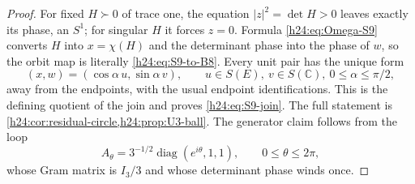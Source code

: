 
\begin{proof}
For fixed $H\succ0$ of trace one, the equation
$|z|^2=\det H>0$ leaves exactly its phase, an $S^1$; for singular $H$ it
forces $z=0$.  Formula \eqref{h24:eq:Omega-S9} converts $H$ into $x=\chi(H)$
and the determinant phase into the phase of $w$, so the orbit map is
literally \eqref{h24:eq:S9-to-B8}.  Every unit pair has the unique form
\[
 (x,w)=(\cos\alpha\,u,\sin\alpha\,v),\qquad
 u\in S(E),\ v\in S(\mathbb C),\ 0\le\alpha\le\pi/2,
\]
away from the endpoints, with the usual endpoint identifications.  This is
the defining quotient of the join and proves \eqref{h24:eq:S9-join}.  The full
statement is \cref{h24:cor:residual-circle,h24:prop:U3-ball}.  The generator claim
follows from the loop
\[
 A_\theta=3^{-1/2}\operatorname{diag}(e^{i\theta},1,1),\qquad
 0\le\theta\le2\pi,
\]
whose Gram matrix is $I_3/3$ and whose determinant phase winds once.
\end{proof}


